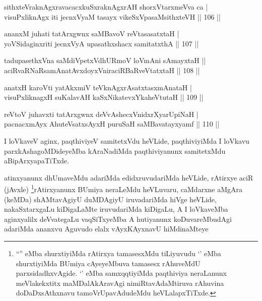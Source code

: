 \begin{shl}
sithxteVraknAgxravacacxkuSxraknAgxrAH shorxVtarxmeVva ca | \\
visuPxliknAgx iti jecnxVyaM tasayx vikeSxVpasaMsithxteVH \hfill|| 106 || 
\end{shl}

\begin{shl}
ananxM juhati tatArxgwnx saMBavoV reVtasasatxtaH | \\
yoVSidaginxriti jecnxVyA upasathxshacx samitatxthA \hfill|| 107 || 
\end{shl}

\begin{shl}
tadupasethxVna saMdiVpetxVdhURmoV loVmAni sAmayxtaH || \\
aciRvaRNaRsamAnatAvxdoyxVniraciRBaRveVtatxtaH \hfill|| 108 || 
\end{shl}

\begin{shl}
anatxH karoVti yatAkxmiV teV\s knAgxrAsatxtasxmAnataH | \\
visuPxliknagxH suKalavAH kaSxNikatevxYkaheVtutaH \hfill|| 109 || 
\end{shl}

\begin{shl}
reVtoV juhavxti tatArxgwnx deVvAshecxVnidxrXyarUpiNaH | \\
pacnacxmAyx AhuteVsatxsAyxH puruSaH saMBavatayxyamf \hfill|| 110 || 
\end{shl}

\begin{artha}
I loVkaveV aginx, paqthiviyeV samitetxVdu heVLide, paqthiviyiMda I
loVkavu parxkAshagoMDideyeMba kAraNadiMda paqthiviyanunx samitetxMdu
aBipArxyapaTiTxde.
\end{artha}

\begin{artha}
atinxyanunx dhUmaveMdu adariMda edidxruvudariMda heVLide, rAtirxye
aciR (jAvxle) \footnote{``\stext'' eMba shurxtiyiMda rAtirxya
  tamasesxMdu tiLiyuvudu `\stext' eMba shurxtiyiMda BUmiya cAyeyeMbuva
tamasesx rAhuveMdU parxsidadhxvAgide. `\stext' eMba samxqqtiyiMda
paqthiviya neraLanunx meVlakekxtitx maMDalAkAravAgi nimiRtavAdaMtiruva
rAhuvina doDaDxsAthxnavu tamoVrUpavAdudeMdu heVLalapxTiTxde.}rAtirxyanunx BUmiya neraLeMdu heVLuvaru,
caMdarxne aMgAra (keMDa) shAMtavAgiyU duMDAgiyU iruvadariMda hiVge
heVLide, nakaSxtarxgaLu kiDigaLaMte iruvudariMda kiDigaLu, A I
loVkaveMba aginxyalilx deVvategaLu vaqSiTxyeMba A hutiyanunx
koDuvareMbudAgi adariMda ananxvu Aguvudo elalx vAyxKAyxnavU
hiMdinaMteye 
\end{artha}

